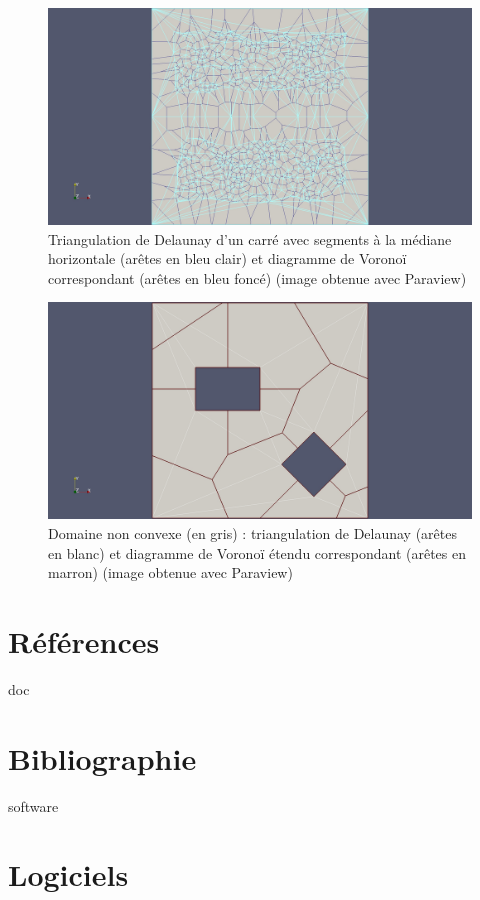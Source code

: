 \documentclass[12pt,a4paper]{report}
\begin{document}
\begin{center}
\begin{figure}[htbp]
\includegraphics[scale=0.35, viewport=530 0 1680 1129, clip]{del_vor.jpg}
\caption{Triangulation de Delaunay d'un carré avec segments à la médiane horizontale (arêtes en bleu clair) et diagramme de Voronoï correspondant (arêtes en bleu foncé) (image obtenue avec Paraview)}
\label{del_vor}
\end{figure}
\end{center}
\clearpage

\begin{center}
\begin{figure}[htbp]
\includegraphics[scale=0.35, viewport=530 0 1680 1129, clip]{sq_del_vor.jpg}
\caption{Domaine non convexe (en gris) : triangulation de Delaunay (arêtes en blanc) et diagramme de Voronoï étendu correspondant (arêtes en marron) (image obtenue avec Paraview)}
\label{sq_del_vor}
\end{figure}
\end{center}
\clearpage

\section{Références}
\vspace*{1cm}


\begin{btSect}{doc}
\section*{Bibliographie}
\btPrintCited
\end{btSect}
\label{biblio}


\begin{btSect}{software}
\section*{Logiciels}
\btPrintCited
\end{btSect}
\label{software}
\end{document}
